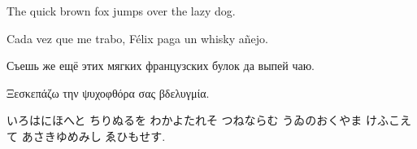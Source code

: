 \documentclass[12pt]{article}
\begin{document}
The quick brown fox jumps over the lazy dog.

\vspace{2cm}
Cada vez que me trabo, Félix paga un whisky añejo.

\vspace{2cm}
Съешь же ещё этих мягких французских булок да выпей чаю.

\vspace{2cm}
Ξεσκεπάζω την ψυχοφθόρα σας βδελυγμία.

\vspace{2cm}
\begin{CJK}{UTF8}{min}
いろはにほへと ちりぬるを わかよたれそ つねならむ うゐのおくやま けふこえて あさきゆめみし ゑひもせす.
\end{CJK}
\end{document}
